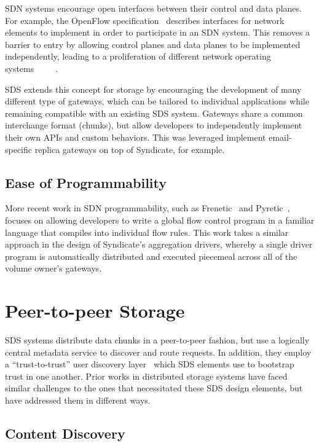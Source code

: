 SDN systems encourage open interfaces between their control and data planes.
For example, the OpenFlow specification~\cite{openflow} describes interfaces for
network elements to implement in order to participate in an SDN system.
This removes a barrier to entry by allowing control planes and data planes
to be implemented independently, leading to a proliferation of different network operating
systems~\cite{onos}~\cite{NOX}~\cite{stratum}~\cite{bigswitch}~\cite{road-to-sdn}.

SDS extends this concept for 
storage by encouraging the development of many different type of gateways, which
can be tailored to individual applications while remaining compatible with an
existing SDS system.  Gateways share a common interchange format (chunks), but
allow developers to independently implement their own APIs and custom behaviors.
This was leveraged implement email-specific replica
gateways on top of Syndicate, for example.

\subsection{Ease of Programmability}

More recent work in SDN programmability, such as Frenetic~\cite{frenetic} and
Pyretic~\cite{pyretic}, focuses on allowing developers to write a global flow
control program in a familiar language that compiles into individual flow rules.
This work takes a similar approach in the design of Syndicate's aggregation
drivers, whereby a single driver program is automatically distributed and
executed piecemeal across all of the volume owner's gateways.

\section{Peer-to-peer Storage}

SDS systems distribute data chunks in a peer-to-peer fashion, but use
a logically central metadata service to discover and route requests.  In
addition, they employ a ``trust-to-trust'' user discovery
layer~\cite{trust-to-trust-principle} which SDS elements use to bootstrap trust
in one another.  Prior works in distributed storage systems have faced similar
challenges to the ones that necessitated these SDS design elements, but have
addressed them in different ways.

\subsection{Content Discovery}


